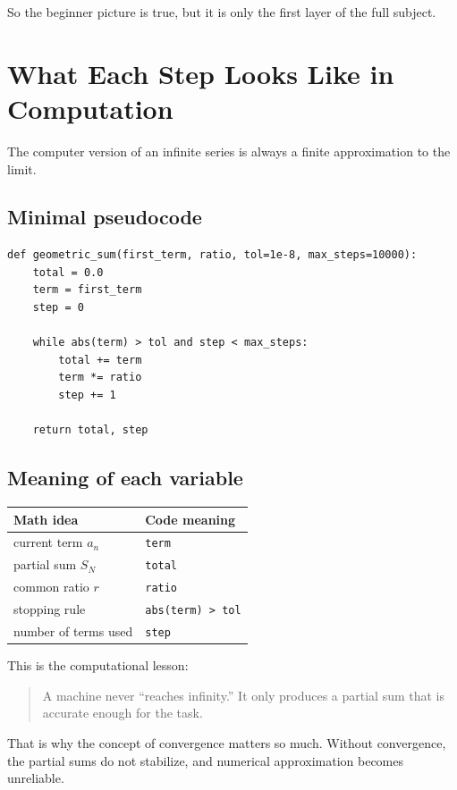 \documentclass[11pt,a4paper]{article}
\theoremstyle{definition}
\theoremstyle{plain}
\begin{document}
So the beginner picture is true, but it is only the first layer of the full subject.

\section{What Each Step Looks Like in Computation}

The computer version of an infinite series is always a finite approximation to the limit.

\subsection*{Minimal pseudocode}

\begin{lstlisting}[style=code]
def geometric_sum(first_term, ratio, tol=1e-8, max_steps=10000):
    total = 0.0
    term = first_term
    step = 0

    while abs(term) > tol and step < max_steps:
        total += term
        term *= ratio
        step += 1

    return total, step
\end{lstlisting}

\subsection*{Meaning of each variable}

\begin{center}
\begin{tabular}{ll}
\toprule
Math idea & Code meaning \\
\midrule
current term \(a_n\) & \texttt{term} \\
partial sum \(S_N\) & \texttt{total} \\
common ratio \(r\) & \texttt{ratio} \\
stopping rule & \texttt{abs(term) > tol} \\
number of terms used & \texttt{step} \\
\bottomrule
\end{tabular}
\end{center}

This is the computational lesson:
\begin{quote}
A machine never ``reaches infinity.''
It only produces a partial sum that is accurate enough for the task.
\end{quote}

That is why the concept of convergence matters so much.
Without convergence, the partial sums do not stabilize, and numerical approximation becomes unreliable.
\end{document}
